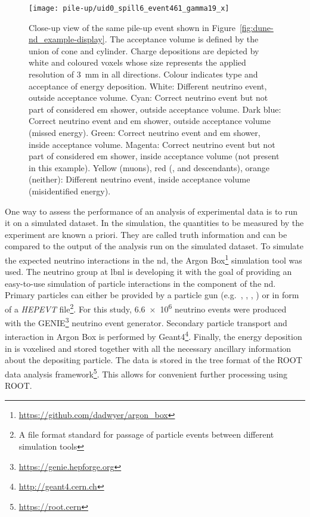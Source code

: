 \begin{figure}[htb]
	\centering
	\texttt{[image: pile-up/uid0\_spill6\_event461\_gamma19\_x]}
	\caption[Pile-up study example event zoom]{%
		Close-up view of the same pile-up event shown in Figure~\ref{fig:dune-nd_example-display}.
		The acceptance volume is defined by the union of cone and cylinder.
		Charge depositions are depicted by white and coloured voxels whose size represents the applied resolution of \SI{3}{\milli\metre} in all directions.
		Colour indicates type and acceptance of energy deposition.
		White: Different neutrino event, outside acceptance volume.
		Cyan: Correct neutrino event but not part of considered \acrshort{em} shower, outside acceptance volume.
		Dark blue: Correct neutrino event and \acrshort{em} shower, outside acceptance volume (missed energy).
		Green: Correct neutrino event and \acrshort{em} shower, inside acceptance volume.
		Magenta: Correct neutrino event but not part of considered \acrshort{em} shower, inside acceptance volume (not present in this example).
		Yellow (muons), red (\Pgg, \Pn and descendants), orange (neither): Different neutrino event, inside acceptance volume (misidentified energy).
	}
	\label{fig:dune-nd_example-display-zoom}
\end{figure}

One way to assess the performance of an analysis of experimental data is to run it on a simulated dataset.
In the simulation, the quantities to be measured by the experiment are known a priori.
They are called truth information and can be compared to the output of the analysis run on the simulated dataset.
To simulate the expected neutrino interactions in the \gls{nd}, the Argon Box\footnote{\url{https://github.com/dadwyer/argon_box}} simulation tool was used.
The neutrino group at \gls{lbnl} is developing it with the goal of providing an easy-to-use simulation of particle interactions in the \lar{} component of the \gls{nd}.
Primary particles can either be provided by a particle gun (e.g.\ \Pem, \Pn, \Pp, \Pgmp) or in form of a \emph{HEPEVT} file\footnote{A file format standard for passage of particle events between different simulation tools}.
For this study, \num{6.6e6} neutrino events were produced with the GENIE\footnote{\url{https://genie.hepforge.org}} neutrino event generator.
Secondary particle transport and interaction in Argon Box is performed by Geant4\footnote{\url{http://geant4.cern.ch}}.
Finally, the energy deposition in \lar{} is voxelised and stored together with all the necessary ancillary information about the depositing particle.
The data is stored in the tree format of the ROOT data analysis framework\footnote{\url{https://root.cern}}.
This allows for convenient further processing using ROOT.

